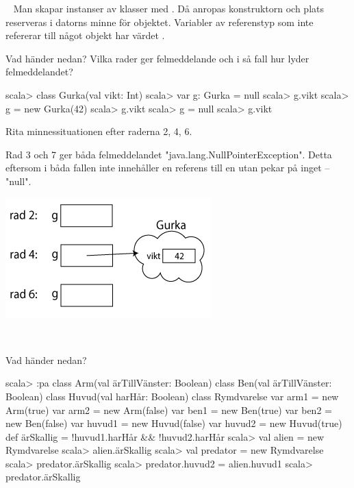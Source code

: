 \Task  \what~  Man skapar instanser av klasser med . Då anropas konstruktorn och plats reserveras i datorns minne för objektet. Variabler av referenstyp som inte refererar till något objekt har värdet .

\Subtask Vad händer nedan? Vilka rader ger felmeddelande och i så fall hur lyder felmeddelandet?

\begin{REPL}
scala> class Gurka(val vikt: Int)
scala> var g: Gurka = null
scala> g.vikt
scala> g = new Gurka(42)
scala> g.vikt
scala> g = null
scala> g.vikt
\end{REPL}

\Subtask\Pen Rita minnessituationen efter raderna 2, 4, 6.

\SOLUTION


\TaskSolved \what


\SubtaskSolved  Rad 3 och 7 ger båda felmeddelandet "java.lang.NullPointerException". Detta eftersom  i båda fallen inte innehåller en referens till en  utan pekar på inget -- "null".

\SubtaskSolved  \includegraphics[scale=0.6]{../img/w06-solutions/1b}


\QUESTEND









\QUESTBEGIN

\Task  \what~

\Subtask Vad händer nedan?
\begin{REPL}
scala> :pa
class Arm(val ärTillVänster: Boolean)
class Ben(val ärTillVänster: Boolean)
class Huvud(val harHår: Boolean)
class Rymdvarelse {
  var arm1 = new Arm(true)
  var arm2 = new Arm(false)
  var ben1 = new Ben(true)
  var ben2 = new Ben(false)
  var huvud1 = new Huvud(false)
  var huvud2 = new Huvud(true)
  def ärSkallig = !huvud1.harHår && !huvud2.harHår
}
scala> val alien = new Rymdvarelse
scala> alien.ärSkallig
scala> val predator = new Rymdvarelse
scala> predator.ärSkallig
scala> predator.huvud2 = alien.huvud1
scala> predator.ärSkallig
\end{REPL}

